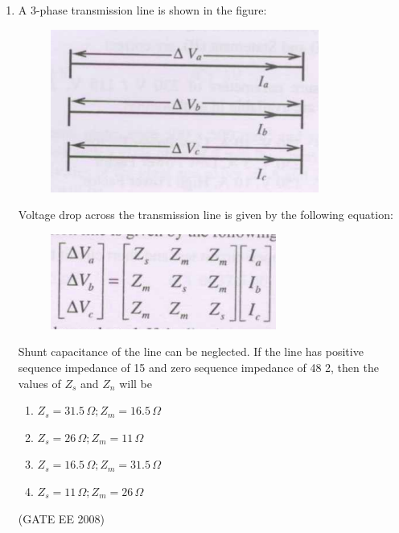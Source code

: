 \documentclass[journal,12pt,onecolumn]{IEEEtran}
\theoremstyle{remark}
\begin{document}
\begin{enumerate}[start=1, label=Q.\arabic*]
 \item  A 3-phase transmission line is shown in the figure:
 \begin{figure}[H]
     \centering
     \includegraphics[width=\columnwidth]{Fig/q16-1.png}
     \caption{}
 \end{figure}
Voltage drop across the transmission line is given by the following equation:
\begin{figure}[H]
     \centering
     \includegraphics[width=\columnwidth]{Fig/q16-2.png}
     \caption{}
 \end{figure}

Shunt capacitance of the line can be neglected. If the line has positive sequence impedance of 15
and zero sequence impedance of 48 2, then the values of $Z_s$ and $Z_n$ will be
\begin{multicols}{2}
    \begin{enumerate}
        \item $Z_{s} = 31.5\, \Omega; Z_{m} = 16.5\, \Omega$
        \item $Z_{s} = 26\, \Omega; Z_{m} = 11\, \Omega$
        \item $Z_{s} = 16.5\, \Omega; Z_{m} = 31.5\, \Omega$
        \item $Z_{s} = 11\, \Omega; Z_{m} = 26\, \Omega$
    \end{enumerate}
\end{multicols}
\hfill (GATE EE 2008)



\end{enumerate}
\end{document}
